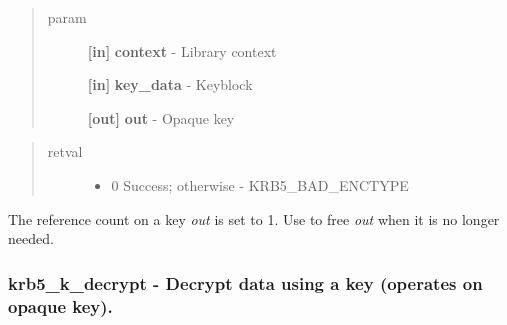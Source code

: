 \documentclass[letterpaper,10pt,english]{sphinxmanual}
\begin{document}
\begin{fulllineitems}
\label{appdev/refs/api/krb5_k_create_key:krb5_k_create_key}
\end{fulllineitems}

\begin{quote}\begin{description}
\item[{param}] \leavevmode
\textbf{{[}in{]}} \textbf{context} - Library context

\textbf{{[}in{]}} \textbf{key\_data} - Keyblock

\textbf{{[}out{]}} \textbf{out} - Opaque key

\end{description}\end{quote}
\begin{quote}\begin{description}
\item[{retval}] \leavevmode\begin{itemize}
\item {} 
0   Success; otherwise - KRB5\_BAD\_ENCTYPE

\end{itemize}

\end{description}\end{quote}

The reference count on a key \emph{out} is set to 1. Use {\hyperref[appdev/refs/api/krb5_k_free_key:krb5_k_free_key]{}} to free \emph{out} when it is no longer needed.


\subsubsection{krb5\_k\_decrypt -  Decrypt data using a key (operates on opaque key).}
\label{appdev/refs/api/krb5_k_decrypt:krb5-k-decrypt-decrypt-data-using-a-key-operates-on-opaque-key}\label{appdev/refs/api/krb5_k_decrypt::doc}
\end{document}

